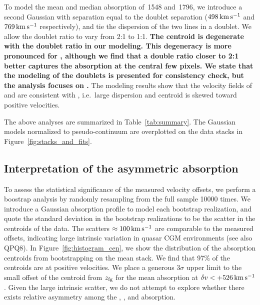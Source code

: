\documentclass[iop]{emulateapj}
\begin{document}
To model the mean and median absorption of \,1548 and \,1796, we introduce a
second Gaussian with separation equal to the doublet separation ($498\,{\rm km\,s^{-1}}$ and
$769\,{\rm km\,s^{-1}}$ respectively), and tie the dispersion of the two lines in a doublet. We
allow the doublet ratio to vary from 2:1 to 1:1.
{\bf The centroid is degenerate with the doublet ratio in our modeling. This degeneracy is more
pronounced for , although we find that a double ratio closer to 2:1 better captures the
absorption at the central few pixels. We state that the modeling of the doublets is presented for
consistency check, but the analysis focuses on .}
The modeling results show that the velocity fields
of  and  are consistent with , i.e.\ large dispersion and centroid
is skewed toward positive velocities.

The above analyses are summarized in Table~\ref{tab:summary}. The Gaussian models normalized to
pseudo-continuum are overplotted on the data stacks in Figure~\ref{fig:stacks_and_fits}.

%


\subsection{Interpretation of the asymmetric absorption}
\label{sec:significance_+ve}

To assess the statistical significance of the measured velocity offsets, we perform a boostrap analysis
by randomly resampling from the full sample 10000 times. We introduce a Gaussian absorption profile
to model each bootstrap realization, and quote the standard deviation in the bootstrap
realizations to be the scatter in the centroids of the data. The scatters
$\approx100\,{\rm km\,s^{-1}}$ are comparable to the measured offsets, indicating large intrinsic
variation in quasar CGM environments (see also QPQ8). In Figure~\ref{fig:histogram_cen}, we show
the distribution of the absorption centroids from bootstrapping on the  mean stack. We
find that 97\% of the centroids are at positive velocities. We place a generous $3\sigma$ upper
limit to the small offset of the centroid from $z_{\rm fg}$ for the  mean absorption at
$\delta v<+526\,{\rm km\,s^{-1}}$. Given the large intrinsic scatter, we do not attempt to explore
whether there exists relative asymmetry among the , , and 
absorption.
\end{document}
